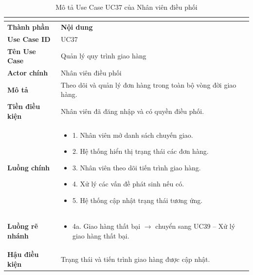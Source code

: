 \begin{longtable}{|C{3cm}|L{11cm}|}
\caption{Mô tả Use Case UC37 của Nhân viên điều phối}\\
\label{tab:mo-ta-uc37-dieu-phoi}\\
\hline
\textbf{Thành phần} & \textbf{Nội dung} \\
\hline
\textbf{Use Case ID} & UC37 \\
\hline
\textbf{Tên Use Case} & Quản lý quy trình giao hàng \\
\hline
\textbf{Actor chính} & Nhân viên điều phối \\
\hline
\textbf{Mô tả} &
Theo dõi và quản lý đơn hàng trong toàn bộ vòng đời giao hàng. \\
\hline
\textbf{Tiền điều kiện} &
Nhân viên đã đăng nhập và có quyền điều phối. \\
\hline
\textbf{Luồng chính} &
\begin{itemize}[leftmargin=*,topsep=2pt,itemsep=2pt]
    \item 1. Nhân viên mở danh sách chuyến giao.
    \item 2. Hệ thống hiển thị trạng thái các đơn hàng.
    \item 3. Nhân viên theo dõi tiến trình giao hàng.
    \item 4. Xử lý các vấn đề phát sinh nếu có.
    \item 5. Hệ thống cập nhật trạng thái tương ứng.
\end{itemize} \\
\hline
\textbf{Luồng rẽ nhánh} &
\begin{itemize}[leftmargin=*,topsep=2pt,itemsep=2pt]
    \item 4a. Giao hàng thất bại $\rightarrow$ chuyển sang UC39 -- Xử lý giao hàng thất bại.
\end{itemize} \\
\hline
\textbf{Hậu điều kiện} &
Trạng thái và tiến trình giao hàng được cập nhật. \\
\hline
\end{longtable}


